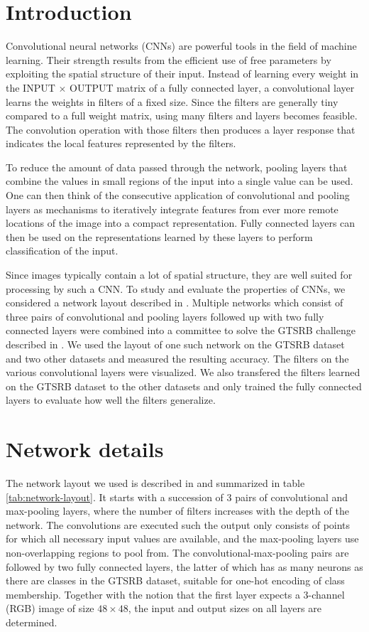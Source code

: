 \documentclass[11pt, a4paper]{article}
\begin{document}
\newpage
\section{Introduction}
Convolutional neural networks (CNNs) are powerful tools in the field of machine learning. Their strength results from the efficient use of free parameters by exploiting the spatial structure of their input. Instead of learning every weight in the INPUT $\times$ OUTPUT matrix of a fully connected layer, a convolutional layer learns the weights in filters of a fixed size. Since the filters are generally tiny compared to a full weight matrix, using many filters and layers becomes feasible. The convolution operation with those filters then produces a layer response that indicates the local features represented by the filters.

To reduce the amount of data passed through the network, pooling layers that combine the values in small regions of the input into a single value can be used. One can then think of the consecutive application of convolutional and pooling layers as mechanisms to iteratively integrate features from ever more remote locations of the image into a compact representation. Fully connected layers can then be used on the representations learned by these layers to perform classification of the input.

Since images typically contain a lot of spatial structure, they are well suited for processing by such a CNN. To study and evaluate the properties of CNNs, we considered a network layout described in \cite{multi-column-neural-network-gtsrb}. Multiple networks which consist of three pairs of convolutional and pooling layers followed up with two fully connected layers were combined into a committee to solve the GTSRB challenge described in \cite{gtsrb}. We used the layout of one such network on the GTSRB dataset and two other datasets and measured the resulting accuracy. The filters on the various convolutional layers were visualized. We also transfered the filters learned on the GTSRB dataset to the other datasets and only trained the fully connected layers to evaluate how well the filters generalize.

\section{Network details}
The network layout we used is described in \cite{multi-column-neural-network-gtsrb} and summarized in table \ref{tab:network-layout}. It starts with a succession of 3 pairs of convolutional and max-pooling layers, where the number of filters increases with the depth of the network. The convolutions are executed such the output only consists of points for which all necessary input values are available, and the max-pooling layers use non-overlapping regions to pool from. The convolutional-max-pooling pairs are followed by two fully connected layers, the latter of which has as many neurons as there are classes in the GTSRB dataset, suitable for one-hot encoding of class membership. Together with the notion that the first layer expects a 3-channel (RGB) image of size $48\times48$, the input and output sizes on all layers are determined.
\end{document}
